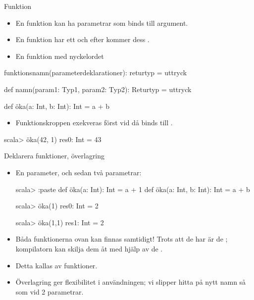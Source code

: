 





\begin{Slide}{Funktion}
\setlength{\leftmargini}{0pt}
\begin{itemize}
  \item En funktion kan ha parametrar som binds till argument.
  \item En funktion har ett  och efter \code{=} kommer dess .
  \item En  funktion  med nyckelordet 
\end{itemize}


 funktionsnamn(parameterdeklarationer): returtyp = uttryck

\vspace{1em}

\begin{Code}
def namn(param1: Typ1, param2: Typ2): Returtyp = uttryck
\end{Code}

\pause

\begin{Code}
def öka(a: Int, b: Int): Int = a + b
\end{Code}

\setlength{\leftmargini}{0pt}
\begin{itemize}
  \item Funktionskroppen exekveras först vid  då  binds till .
\end{itemize}

\begin{REPL}
scala> öka(42, 1)
res0: Int = 43
\end{REPL}


\end{Slide}


\begin{Slide}{Deklarera funktioner, överlagring}
\begin{itemize}
\item En parameter, och sedan två parametrar:
\begin{REPL}
scala> :paste
  def öka(a: Int): Int = a + 1
  def öka(a: Int, b: Int): Int = a + b

scala> öka(1)
res0: Int = 2

scala> öka(1,1)
res1: Int = 2

\end{REPL}
\item Båda funktionerna ovan kan finnas samtidigt! Trots att de har  är de ; kompilatorn kan skilja dem åt med hjälp av de .

\item Detta kallas   av funktioner.
\item Överlagring ger flexibilitet i användningen; vi slipper hitta på nytt namn så som  vid 2 parametrar.
\end{itemize}
\end{Slide}



